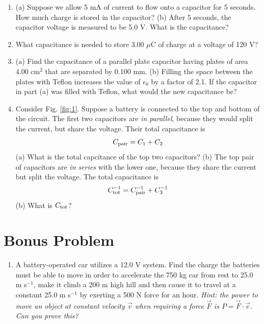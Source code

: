 \documentclass{article}
\begin{document}
\begin{enumerate}
\item (a) Suppose we allow 5 mA of current to flow onto a capacitor for 5 seconds.  How much charge is stored in the capacitor? (b) After 5 seconds, the capacitor voltage is measured to be 5.0 V.  What is the capacitance? \\ \vspace{3cm}
\item What capacitance is needed to store 3.00 $\mu$C of charge at a voltage of 120 V? \\ \vspace{1cm}
\item (a) Find the capacitance of a parallel plate capacitor having plates of area 4.00 cm$^2$ that are separated by 0.100 mm. (b) Filling the space between the plates with Teflon increases the value of $\epsilon_0$ by a factor of 2.1.  If the capacitor in part (a) was filled with Teflon, what would the new capacitance be? \\ \vspace{2cm}
\item Consider Fig. \ref{fig:1}.  Suppose a battery is connected to the top and bottom of the circuit.  The first two capacitors are \textit{in parallel}, because they would split the current, but share the voltage. Their total capacitance is
\begin{equation}
C_{\rm pair} = C_1 + C_2
\end{equation}
(a) What is the total capcitance of the top two capacitors? (b) The top pair of capacitors are \textit{in series} with the lower one, because they share the current but split the voltage.  The total capacitance is
\begin{equation}
C_{\rm tot}^{-1} = C_{\rm pair}^{-1} + C_{\rm 3}^{-1}
\end{equation}
(b) What is $C_{\rm tot}$? \\ \vspace{2cm}
\end{enumerate}

\section{Bonus Problem}

\begin{enumerate}
\item A battery-operated car utilizes a 12.0 V system. Find the charge the batteries must be able to move in order to accelerate the 750 kg car from rest to 25.0 m s$^{-1}$, make it climb a 200 m high hill and then cause it to travel at a constant 25.0 m s$^{-1}$ by exerting a 500 N force for an hour.  \textit{Hint: the power to move an object at constant velocity $\vec{v}$ when requiring a force $\vec{F}$ is $P = \vec{F} \cdot \vec{v}$.  Can you prove this?}
\end{enumerate}
\end{document}
